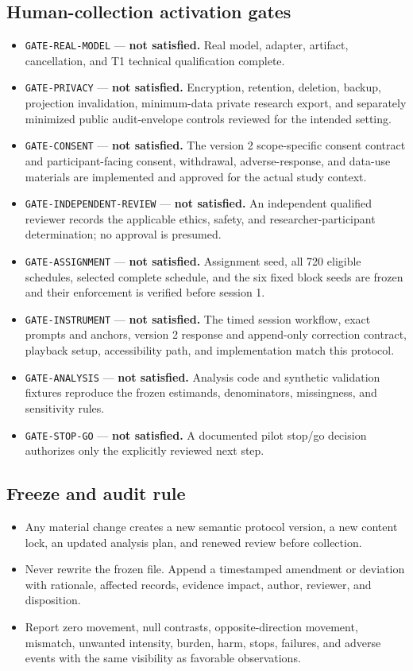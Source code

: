 \subsection*{Human-collection activation gates}
\begin{itemize}[leftmargin=1.35em,itemsep=0.42em]
  \item \texttt{GATE-REAL-MODEL} --- \textbf{not satisfied.} Real model, adapter, artifact, cancellation, and T1 technical qualification complete.
  \item \texttt{GATE-PRIVACY} --- \textbf{not satisfied.} Encryption, retention, deletion, backup, projection invalidation, minimum-data private research export, and separately minimized public audit-envelope controls reviewed for the intended setting.
  \item \texttt{GATE-CONSENT} --- \textbf{not satisfied.} The version 2 scope-specific consent contract and participant-facing consent, withdrawal, adverse-response, and data-use materials are implemented and approved for the actual study context.
  \item \texttt{GATE-INDEPENDENT-REVIEW} --- \textbf{not satisfied.} An independent qualified reviewer records the applicable ethics, safety, and researcher-participant determination; no approval is presumed.
  \item \texttt{GATE-ASSIGNMENT} --- \textbf{not satisfied.} Assignment seed, all 720 eligible schedules, selected complete schedule, and the six fixed block seeds are frozen and their enforcement is verified before session 1.
  \item \texttt{GATE-INSTRUMENT} --- \textbf{not satisfied.} The timed session workflow, exact prompts and anchors, version 2 response and append-only correction contract, playback setup, accessibility path, and implementation match this protocol.
  \item \texttt{GATE-ANALYSIS} --- \textbf{not satisfied.} Analysis code and synthetic validation fixtures reproduce the frozen estimands, denominators, missingness, and sensitivity rules.
  \item \texttt{GATE-STOP-GO} --- \textbf{not satisfied.} A documented pilot stop/go decision authorizes only the explicitly reviewed next step.
\end{itemize}

\subsection*{Freeze and audit rule}
\begin{itemize}[leftmargin=1.35em,itemsep=0.42em]
  \item Any material change creates a new semantic protocol version, a new content lock, an updated analysis plan, and renewed review before collection.
  \item Never rewrite the frozen file. Append a timestamped amendment or deviation with rationale, affected records, evidence impact, author, reviewer, and disposition.
  \item Report zero movement, null contrasts, opposite-direction movement, mismatch, unwanted intensity, burden, harm, stops, failures, and adverse events with the same visibility as favorable observations.
\end{itemize}
